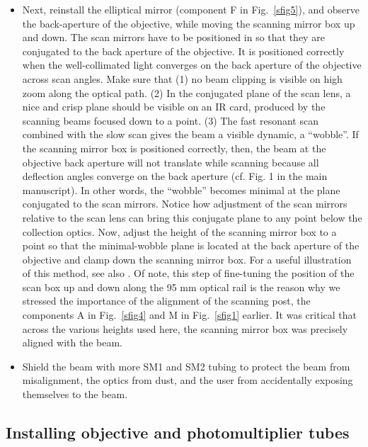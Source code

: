 \documentclass[10pt,letterpaper]{article}
\begin{document}
\begin{itemize}
    \item Next, reinstall the elliptical mirror (component F in Fig.~\ref{sfig5}), and observe the back-aperture of the objective, while moving the scanning mirror box up and down. The scan mirrors have to be positioned in so that they are conjugated to the back aperture of the objective. It is positioned correctly when the well-collimated light converges on the back aperture of the objective across scan angles. Make sure that (1) no beam clipping is visible on high zoom along the optical path. (2) In the conjugated plane of the scan lens, a nice and crisp plane should be visible on an IR card, produced by the scanning beams focused down to a point. (3) The fast resonant scan combined with the slow scan gives the beam a visible dynamic, a ``wobble''. If the scanning mirror box is positioned correctly, then, the beam at the objective back aperture will not translate while scanning because all deflection angles converge on the back aperture (cf. Fig. 1 in the main manuscript). In other words, the ``wobble'' becomes minimal at the plane conjugated to the scan mirrors. Notice how adjustment of the scan mirrors relative to the scan lens can bring this conjugate plane to any point below the collection optics. Now, adjust the height of the scanning mirror box to a point so that the minimal-wobble plane is located at the back aperture of the objective and clamp down the scanning mirror box. For a useful illustration of this method, see also \cite{Yao2023}. Of note, this step of fine-tuning the position of the scan box up and down along the 95 mm optical rail is the reason why we stressed the importance of the alignment of the scanning post, the components A in Fig.~\ref{sfig4} and M in Fig.~\ref{sfig1} earlier. It was critical that across the various heights used here, the scanning mirror box was precisely aligned with the beam.
    \item Shield the beam with more SM1 and SM2 tubing to protect the beam from misalignment, the optics from dust, and the user from accidentally exposing themselves to the beam.
\end{itemize}
%
\subsection{Installing objective and photomultiplier tubes}
%
\end{document}
